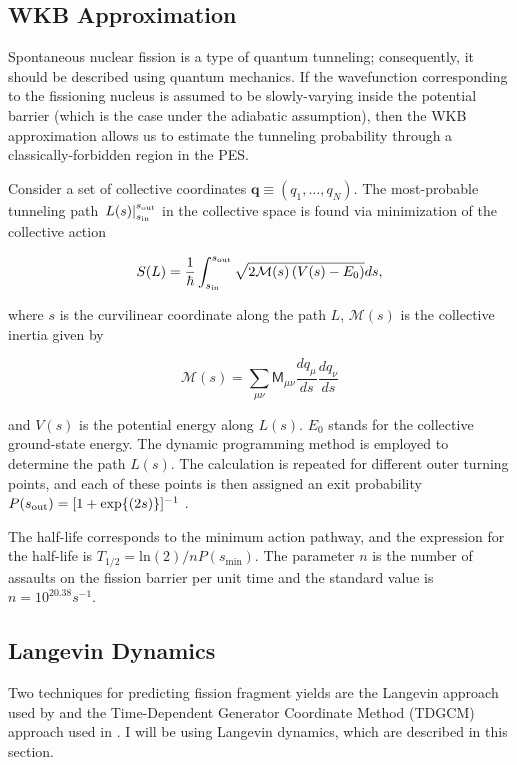 \subsection{WKB Approximation}
Spontaneous nuclear fission is a type of quantum tunneling; consequently, it should be described using quantum mechanics. If the wavefunction corresponding to the fissioning nucleus is assumed to be slowly-varying inside the potential barrier (which is the case under the adiabatic assumption), then the WKB approximation allows us to estimate the tunneling probability through a classically-forbidden region in the PES.

Consider a set of collective coordinates $\mathbf{q}\equiv(q_1, \ldots, q_N)$. The most-probable tunneling path $\left. L(s) \right|_{s_{\rm in}}^{s_{\rm out}}$ in the collective space is found via minimization of the collective action

\begin{equation}\label{eq:action} 
S(L) = \frac{1}{\hbar}\int_{s_{\rm in}}^{s_{\rm out}} \sqrt{2\mathcal{M}(s)\left(V(s)-E_0\right)}ds,
\end{equation} 

\noindent where $s$ is the curvilinear coordinate along the path $L$,
$\mathcal{M}(s)$ is the collective inertia given by \cite{Sadhukhan2013}

\begin{equation}
\mathcal{M}(s) = \sum_{\mu\nu} \mathsf{M}_{\mu\nu} \frac{dq_\mu}{ds} \frac{dq_\nu}{ds}
\end{equation}

\noindent and $V(s)$ is the potential energy along $L(s)$. $E_0$ stands for the collective ground-state
energy. The dynamic programming method \cite{Baran1981} is employed to determine
the path $L(s)$. The calculation is repeated for different outer turning points,
and each of these points is then assigned an exit  probability $P(s_{\rm out})=[1+\exp{(2s)}]^{-1}$ \cite{Baran1978}. 

The half-life corresponds to the minimum action pathway, and the expression for the half-life is $T_{1/2} = \mathrm{ln}(2)/nP(s_\mathrm{min})$. The parameter $n$ is the number of assaults on the fission barrier per unit time and the standard value is $n=10^{20.38} s^{-1}$.

\subsection{Langevin Dynamics}
Two techniques for predicting fission fragment yields are the Langevin approach used by \cite{Sadhukhan2016} and the Time-Dependent Generator Coordinate Method (TDGCM) approach used in \cite{Younes2012}. I will be using Langevin dynamics, which are described in this section.

